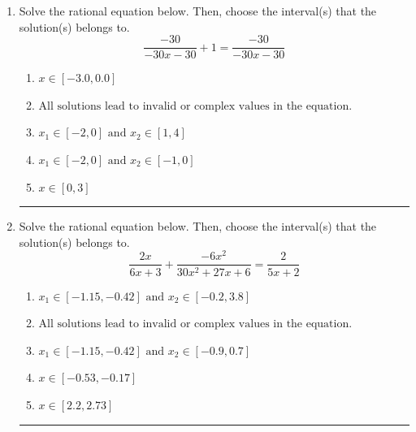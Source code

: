 \documentclass[14pt]{extbook}
\newcommand{\litem}[1]{\item#1\hspace*{-1cm}\rule{\textwidth}{0.4pt}}
\begin{document}
\begin{enumerate}
\litem{
Solve the rational equation below. Then, choose the interval(s) that the solution(s) belongs to.\[ \frac{-30}{-30x -30} + 1 = \frac{-30}{-30x -30} \]\begin{enumerate}[label=\Alph*.]
\item \( x \in [-3.0,0.0] \)
\item \( \text{All solutions lead to invalid or complex values in the equation.} \)
\item \( x_1 \in [-2, 0] \text{ and } x_2 \in [1,4] \)
\item \( x_1 \in [-2, 0] \text{ and } x_2 \in [-1,0] \)
\item \( x \in [0,3] \)

\end{enumerate} }
\litem{
Solve the rational equation below. Then, choose the interval(s) that the solution(s) belongs to.\[ \frac{2x}{6x + 3} + \frac{-6x^{2}}{30x^{2} +27 x + 6} = \frac{2}{5x + 2} \]\begin{enumerate}[label=\Alph*.]
\item \( x_1 \in [-1.15, -0.42] \text{ and } x_2 \in [-0.2,3.8] \)
\item \( \text{All solutions lead to invalid or complex values in the equation.} \)
\item \( x_1 \in [-1.15, -0.42] \text{ and } x_2 \in [-0.9,0.7] \)
\item \( x \in [-0.53,-0.17] \)
\item \( x \in [2.2,2.73] \)


\end{enumerate}}
\end{enumerate}
\end{document}
